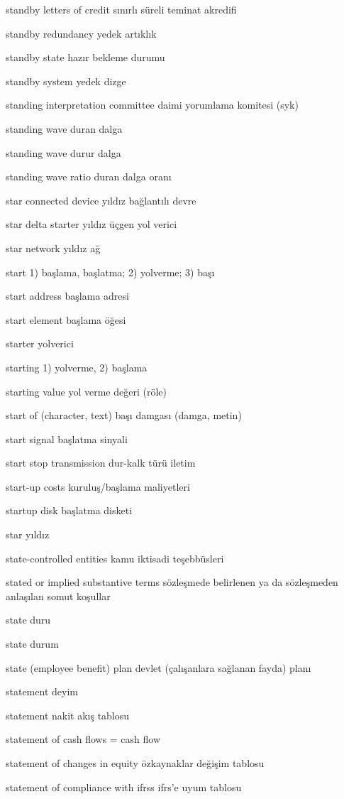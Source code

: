 \documentclass[12pt,fleqn]{article}\usepackage{../../common}
\begin{document}
standby letters of credit sınırlı süreli teminat akredifi

standby redundancy yedek artıklık

standby state hazır bekleme durumu

standby system yedek dizge

standing interpretation committee daimi yorumlama komitesi (syk)

standing wave duran dalga

standing wave durur dalga

standing wave ratio duran dalga oranı

star connected device yıldız bağlantılı devre

star delta starter yıldız üçgen yol verici

star network yıldız ağ

start 1) başlama, başlatma; 2) yolverme; 3) başı

start address başlama adresi

start element başlama öğesi

starter yolverici

starting 1) yolverme, 2) başlama

starting value yol verme değeri (röle)

start of (character, text) başı damgası (damga, metin)

start signal başlatma sinyali

start stop transmission dur-kalk türü iletim

start-up costs kuruluş/başlama maliyetleri

startup disk başlatma disketi

star yıldız

state-controlled entities kamu iktisadi teşebbüsleri

stated or implied substantive terms sözleşmede belirlenen ya da sözleşmeden anlaşılan somut koşullar

state duru

state durum

state (employee benefit) plan devlet (çalışanlara sağlanan fayda) planı

statement deyim

statement nakit akış tablosu

statement of cash flows = cash flow

statement of changes in equity özkaynaklar değişim tablosu

statement of compliance with ifrss ifrs'e uyum tablosu
\end{document}

